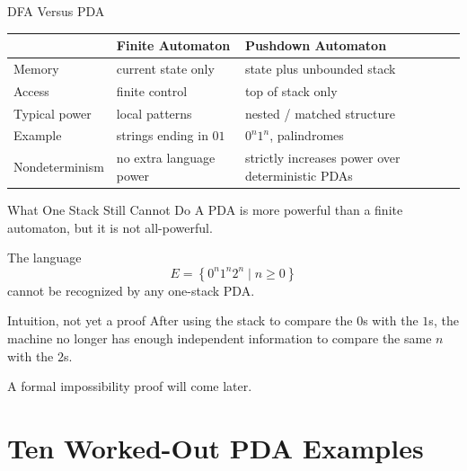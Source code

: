 \documentclass[aspectratio=169,10pt]{beamer}
\newcommand{\lang}[1]{\left\{#1\right\}}
\begin{document}
\begin{frame}{DFA Versus PDA}
\centering
\renewcommand{\arraystretch}{1.35}
\begin{tabular}{p{}p{}p{}}
\toprule
& \textbf{Finite Automaton} & \textbf{Pushdown Automaton}\\
\midrule
Memory & current state only & state plus unbounded stack\\
Access & finite control & top of stack only\\
Typical power & local patterns & nested / matched structure\\
Example & strings ending in $01$ & $0^n1^n$, palindromes\\
Nondeterminism & no extra language power & strictly increases power over deterministic PDAs\\
\bottomrule
\end{tabular}
\end{frame}

\begin{frame}{What One Stack Still Cannot Do}
A PDA is more powerful than a finite automaton, but it is not all-powerful.

\vspace{0.8em}
The language
\[
E=\lang{0^n1^n2^n\mid n\ge0}
\]
cannot be recognized by any one-stack PDA.

\vspace{0.8em}
\begin{alertblock}{Intuition, not yet a proof}
After using the stack to compare the $0$s with the $1$s, the machine no longer has enough independent information to compare the same $n$ with the $2$s.
\end{alertblock}

A formal impossibility proof will come later.
\end{frame}


\section{Ten Worked-Out PDA Examples}
\end{document}
